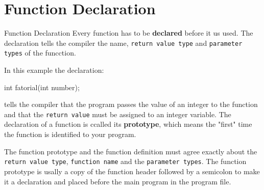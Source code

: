 \documentclass[../lecture4-functions.tex]{subfiles}
\begin{document}
\section{Function Declaration}


\begin{frame}[fragile]{Function Declaration}
    Every function has to be \textbf{declared} before it us used. The declaration tells the compiler the name, \verb|return value type| and \verb|parameter types| of the funcction. \newline

    In this example the declaration:

    \begin{cppcode}[lastline = 1, fontsize=\footnotesize]
int fatorial(int number);
    \end{cppcode}

    tells the compiler that the program passes the value of an integer to the function and that the \verb|return value| must be assigned to an integer variable. The declaration of a function is ccalled its \textbf{prototype}, which means the "first" time the function is identified to your program. \newline

    The function prototype and the function definition must agree exactly about the \verb|return value type|, \verb|function name| and the \verb|parameter types|. The function prototype is usally a copy of the function header followed by a semicolon to make it a declaration and placed before the main program in the program file.
\end{frame}

\end{document}
